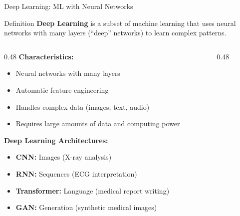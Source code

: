\documentclass[aspectratio=169, 10pt]{beamer}
\begin{document}
\begin{frame}{Deep Learning: ML with Neural Networks}

    \begin{block}{\footnotesize Definition}
        \footnotesize
        \textbf{Deep Learning} is a subset of machine learning that uses neural networks with many layers (``deep'' networks) to learn complex patterns.
    \end{block}

    \vspace{2mm}
    \begin{columns}
        \begin{column}{0.48\textwidth}
            \textbf{Characteristics:}
            \begin{itemize}
                \item Neural networks with many layers
                \item Automatic feature engineering
                \item Handles complex data (images, text, audio)
                \item Requires large amounts of data and computing power
            \end{itemize}

            \vspace{2mm}
            \textbf{Deep Learning Architectures:}
            \begin{itemize}
                \item \textbf{CNN:} Images (X-ray analysis)
                \item \textbf{RNN:} Sequences (ECG interpretation)
                \item \textbf{Transformer:} Language (medical report writing)
                \item \textbf{GAN:} Generation (synthetic medical images)
            \end{itemize}
        \end{column}

        \begin{column}{0.48\textwidth}
            \begin{center}
\end{center}
\end{column}
\end{columns}
\end{frame}
\end{document}
